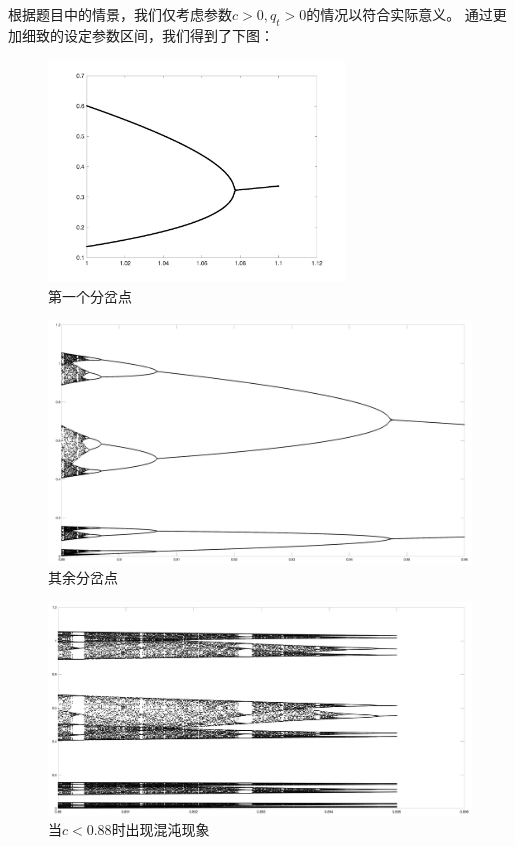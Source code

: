 \documentclass{article}
\begin{document}
根据题目中的情景，我们仅考虑参数$c>0,q_t>0$的情况以符合实际意义。
通过更加细致的设定参数区间，我们得到了下图：
\begin{figure}[H]
    \centering
    \includegraphics[width=0.7\textwidth]{pic82.png}
    \caption{第一个分岔点}
\end{figure}

\begin{figure}[H]
    \centering
    \includegraphics[width=1\textwidth]{pic84.png}
    \caption{其余分岔点}
\end{figure}

\begin{figure}[H]
    \centering
    \includegraphics[width=1\textwidth]{pic85.png}
    \caption{当$c<0.88$时出现混沌现象}
\end{figure}
\end{document}
